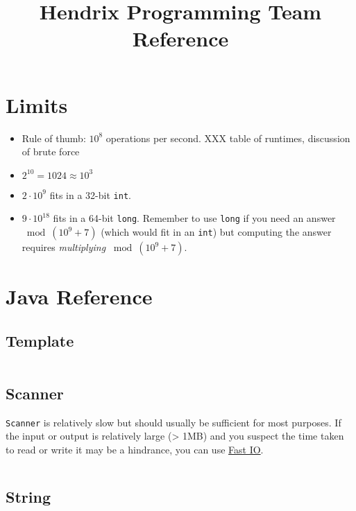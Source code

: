 \documentclass[10pt]{article}
\newcommand{\code}[1]{\inputminted[fontsize=\normalsize]{java}{code/#1}}
\begin{document}
\title{Hendrix Programming Team Reference}

\maketitle

\tableofcontents
\newpage

\section{Limits}

\begin{itemize}
\item Rule of thumb: $10^8$ operations per second.
  XXX table of runtimes, discussion of brute force
\item $2^{10} = 1024 \approx 10^3$
\item $2 \cdot 10^9$ fits in a 32-bit \texttt{int}.
\item $9 \cdot 10^{18}$ fits in a 64-bit \texttt{long}.  Remember to
  use \texttt{long} if you need an answer $\bmod (10^9 + 7)$ (which
  would fit in an \texttt{int}) but computing the answer requires
  \emph{multiplying} $\bmod (10^9 + 7)$.
\end{itemize}

\section{Java Reference}

\subsection{Template}

\code{java/Template.java}

\subsection{Scanner}

\texttt{Scanner} is relatively slow but should usually be sufficient
for most purposes.  If the input or output is relatively large (> 1MB)
and you suspect the time taken to read or write it may be a hindrance,
you can use \hyperref[sec:fastio]{Fast IO}.

\code{java/ScannerExample.java}

\subsection{String}
\end{document}
